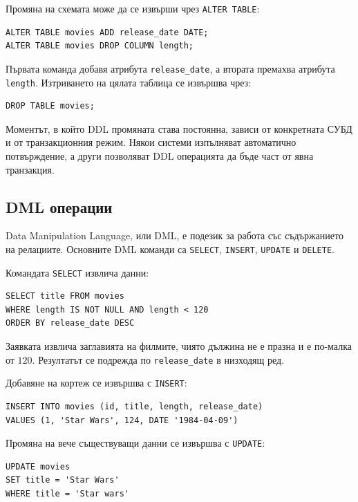 Промяна на схемата може да се извърши чрез \texttt{ALTER TABLE}:

\begin{verbatim}
ALTER TABLE movies ADD release_date DATE;
ALTER TABLE movies DROP COLUMN length;
\end{verbatim}

Първата команда добавя атрибута \texttt{release\_date}, а втората премахва атрибута \texttt{length}. Изтриването на цялата таблица се извършва чрез:

\begin{verbatim}
DROP TABLE movies;
\end{verbatim}

Моментът, в който DDL промяната става постоянна, зависи от конкретната СУБД и от транзакционния режим. Някои системи изпълняват автоматично потвърждение, а други позволяват DDL операцията да бъде част от явна транзакция.

\subsection{DML операции}\label{s:23.3.2}

Data Manipulation Language, или DML, е подезик за работа със съдържанието на релациите. Основните DML команди са \texttt{SELECT}, \texttt{INSERT}, \texttt{UPDATE} и \texttt{DELETE}.

Командата \texttt{SELECT} извлича данни:

\begin{verbatim}
SELECT title FROM movies
WHERE length IS NOT NULL AND length < 120
ORDER BY release_date DESC
\end{verbatim}

Заявката извлича заглавията на филмите, чиято дължина не е празна и е по-малка от $120$. Резултатът се подрежда по \texttt{release\_date} в низходящ ред.

Добавяне на кортеж се извършва с \texttt{INSERT}:

\begin{verbatim}
INSERT INTO movies (id, title, length, release_date)
VALUES (1, 'Star Wars', 124, DATE '1984-04-09')
\end{verbatim}

Промяна на вече съществуващи данни се извършва с \texttt{UPDATE}:

\begin{verbatim}
UPDATE movies
SET title = 'Star Wars'
WHERE title = 'Star wars'
\end{verbatim}


